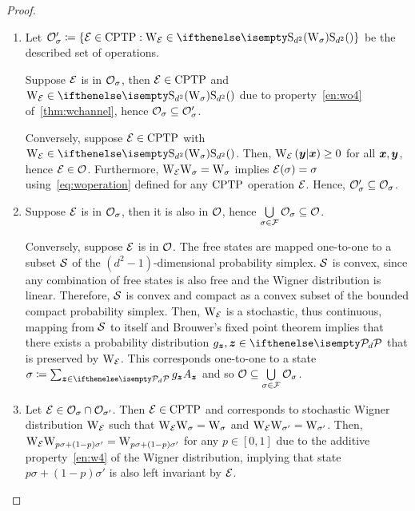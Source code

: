 \begin{proof}
    \begin{enumerate}
    \item Let $\O_\sigma' \coloneqq \{ \E \in \cptp: \W{\E} \in \stochw \}$ be the described set of operations.
    
    Suppose $\E$ is in $\O_\sigma$, then $\E \in \cptp$ and $\W{\E} \in \stochw$ due to property~\ref{en:wo4} of~\cref{thm:wchannel}, hence $\O_\sigma \subseteq \O_\sigma'$.
    
    Conversely, suppose $\E \in \cptp$ with $\W{\E} \in \stochw$. 
    Then, $\W[\bmy|\bmx]{\E} \geq 0$ for all $\bmx, \bmy$, hence $\E \in \O$.
    Furthermore, $\W{\E} \W{\sigma} = \W{\sigma}$ implies $\E(\sigma) = \sigma$ using~\cref{eq:woperation} defined for any $\cptp$ operation $\E$.
    Hence, $\O_\sigma' \subseteq \O_\sigma$.
    
    \item Suppose $\E$ is in $\O_\sigma$, then it is also in $\O$, hence $\bigcup\limits_{\sigma \in \F} \O_\sigma \subseteq \O$.
    
    Conversely, suppose $\E$ is in $\O$. 
    The free states are mapped one-to-one to a subset $\cal{S}$ of the $(d^2 - 1)$-dimensional probability simplex.
    $\cal{S}$ is convex, since any combination of free states is also free and the Wigner distribution is linear.
    Therefore, $\cal{S}$ is convex and compact as a convex subset of the bounded compact probability simplex. 
    Then, $\W{\E}{}$ is a stochastic, thus continuous, mapping from $\cal{S}$ to itself and Brouwer's fixed point theorem  implies that there exists a probability distribution $g_{\bmz}, \bmz \in \pd$ that is preserved by $\W{\E}{}$.
    This corresponds one-to-one to a state $\sigma \coloneqq \sum_{\bmz \in \pd} g_{\bmz} A_{\bmz}$ and so $\O \subseteq \bigcup\limits_{\sigma \in \F} \O_\sigma$.
    
    \item Let $\E \in \O_{\sigma} \cap \O_{\sigma'}$.
    Then $\E \in \cptp$ and corresponds to stochastic Wigner distribution $\W{\E}$ such that $\W{\E} \W{\sigma} = \W{\sigma}$ and $\W{\E} \W{\sigma'} = \W{\sigma'}$.
    Then, $\W{\E} \W{p\sigma + (1-p)\sigma'} = \W{p\sigma + (1-p)\sigma'}$ for any $p \in [0,1]$ due to the additive property~\ref{en:w4} of the Wigner distribution, implying that state $p\sigma + (1-p)\sigma'$ is also left invariant by $\E$.
    \end{enumerate}
\end{proof}


